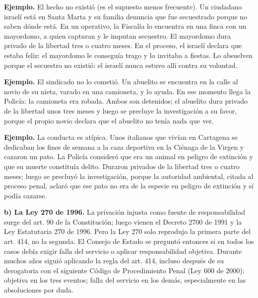 \begin{ejemplo}
\textcolor[HTML]{4F6228}{\textbf{Ejemplo. }}El hecho no existió (es el supuesto menos frecuente). Un ciudadano israelí está en Santa Marta y su familia denuncia que fue secuestrado porque no saben dónde está. En un operativo, la Fiscalía lo encuentra en una finca con un mayordomo, a quien capturan y le imputan secuestro. El mayordomo dura privado de la libertad tres o cuatro meses. En el proceso, el israelí declara que estaba feliz: el mayordomo le conseguía trago y lo invitaba a fiestas. Lo absuelven porque el secuestro no existió: el israelí nunca estuvo allí contra su voluntad.
\par
\textcolor[HTML]{4F6228}{\textbf{Ejemplo. }}El sindicado no lo cometió. Un abuelito se encuentra en la calle al novio de su nieta, varado en una camioneta, y lo ayuda. En ese momento llega la Policía: la camioneta era robada. Ambos son detenidos; el abuelito dura privado de la libertad unos tres meses y luego se precluye la investigación a su favor, porque el propio novio declara que el abuelito no tenía nada que ver.
\par
\textcolor[HTML]{4F6228}{\textbf{Ejemplo. }}La conducta es atípica. Unos italianos que vivían en Cartagena se dedicaban los fines de semana a la caza deportiva en la Ciénaga de la Virgen y cazaron un pato. La Policía consideró que era un animal en peligro de extinción y que su muerte constituía delito. Duraron privados de la libertad tres o cuatro meses; luego se precluyó la investigación, porque la autoridad ambiental, citada al proceso penal, aclaró que ese pato no era de la especie en peligro de extinción y sí podía cazarse.
\end{ejemplo}
\textbf{b) La Ley 270 de 1996.} La privación injusta como fuente de responsabilidad surge del art. 90 de la Constitución; luego vienen el Decreto 2700 de 1991 y la Ley Estatutaria 270 de 1996. Pero la Ley 270 solo reprodujo la primera parte del art. 414, no la segunda. El Consejo de Estado se preguntó entonces si en todos los casos debía exigir falla del servicio o aplicar responsabilidad objetiva. Durante muchos años siguió aplicando la regla del art. 414, incluso después de su derogatoria con el siguiente Código de Procedimiento Penal (Ley 600 de 2000): objetiva en los tres eventos; falla del servicio en los demás, especialmente en las absoluciones por duda.

